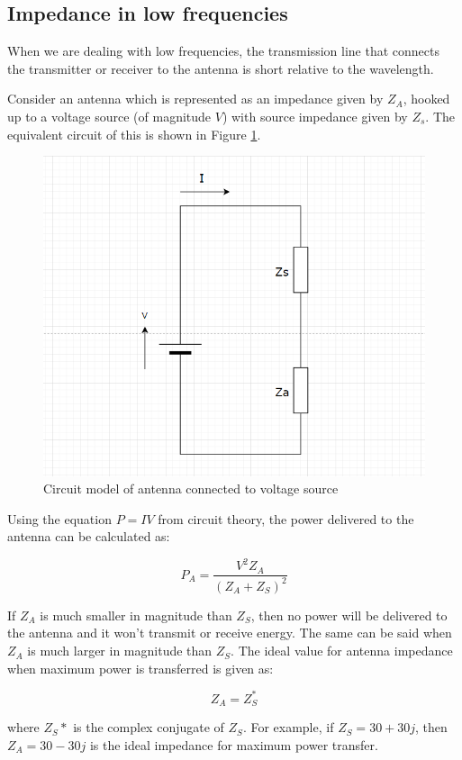 \documentclass[a4paper,12pt]{report}
\begin{document}
\subsection{Impedance in low frequencies}

When we are dealing with low frequencies,
the transmission line that connects the transmitter or receiver
to the antenna is short relative to the wavelength.

Consider an antenna which is represented as an impedance given by $Z_A$,
hooked up to a voltage source (of magnitude $V$) with source impedance given by $Z_s$.
The equivalent circuit of this is shown in
Figure \ref{fig:low_freq_circuit_diagram}.

\begin{figure}
  \begin{center}
    \includegraphics[clip, keepaspectratio, width=0.5\linewidth]{img/low_freq_circuit_diagram.png}
    \caption{Circuit model of antenna connected to voltage source}
    \label{fig:low_freq_circuit_diagram}
  \end{center}
\end{figure}

Using the equation $P=IV$ from circuit theory,
the power delivered to the antenna can be calculated as:

\begin{equation}
  P_A = \frac{V^2 Z_A}{(Z_A + Z_S) ^2}
\end{equation}

If $Z_A$ is much smaller in magnitude than $Z_S$,
then no power will be delivered to the antenna and
it won't transmit or receive energy.
The same can be said when $Z_A$ is much larger in magnitude than $Z_S$.
The ideal value for antenna impedance when maximum power is transferred is given as:

\begin{equation}
  Z_A = Z_S^*
\end{equation}

where $Z_S*$ is the complex conjugate of $Z_S$.
For example, if $Z_S = 30 + 30j$, then $Z_A = 30 - 30j$ is the ideal
impedance for maximum power transfer.
\end{document}
